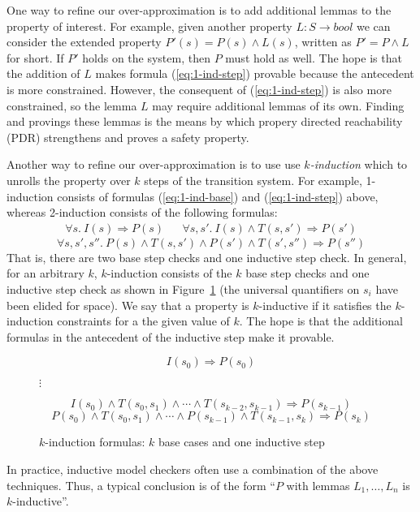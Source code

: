 One way to refine our over-approximation is to add additional lemmas
to the property of interest. For example, given another property $L :
S \to bool$ we can consider the extended property $P'(s) = P(s) \land
L(s)$, written as $P' = P \land L$ for short. If $P'$ holds on the
system, then $P$ must hold as well. The hope is that the addition of
$L$ makes formula (\ref{eq:1-ind-step}) provable because the
antecedent is more constrained. However, the consequent of
(\ref{eq:1-ind-step}) is also more constrained, so the lemma $L$ may
require additional lemmas of its own. Finding and provings these
lemmas is the means by which propery directed reachability (PDR)
strengthens and proves a safety property.

Another way to refine our over-approximation is to use use {\em
  $k$-induction} which to unrolls the property over $k$ steps of the
transition system. For example, 1-induction consists of formulas
(\ref{eq:1-ind-base}) and (\ref{eq:1-ind-step}) above, whereas
2-induction consists of the following formulas:
\begin{align*}
  \forall s.~ I(s) \Rightarrow P(s)
&&  \forall s, s'.~ I(s) \land T(s, s') \Rightarrow P(s')
\end{align*}
\begin{equation*}
  \forall s, s', s''.~ P(s) \land T(s, s') \land P(s') \land T(s',
  s'') \Rightarrow P(s'')
\end{equation*}
That is, there are two base step checks and one inductive step check.
In general, for an arbitrary $k$, $k$-induction consists of the $k$
base step checks and one inductive step check as shown in
Figure~\ref{fig:k-induction} (the universal quantifiers on $s_i$ have
been elided for space). We say that a property is $k$-inductive if it
satisfies the $k$-induction constraints for a the given value of $k$.
The hope is that the additional formulas in the antecedent of the
inductive step make it provable.

\begin{figure}
\begin{equation*}
  I(s_0) \Rightarrow P(s_0)
\end{equation*}
\begin{center}
$\vdots$
\end{center}
\begin{equation*}
  I(s_0) \land T(s_0, s_1) \land \cdots
  \land T(s_{k-2}, s_{k-1}) \Rightarrow P(s_{k-1})
\end{equation*}
\begin{equation*}
  P(s_0) \land T(s_0, s_1) \land \cdots \land P(s_{k-1})
  \land T(s_{k-1}, s_k) \Rightarrow P(s_k)
\end{equation*}
\caption{$k$-induction formulas: $k$ base cases and one inductive
  step}
\label{fig:k-induction}
\end{figure}

In practice, inductive model checkers often use a combination of the
above techniques. Thus, a typical conclusion is of the form ``$P$ with
lemmas $L_1, \ldots, L_n$ is $k$-inductive''.



